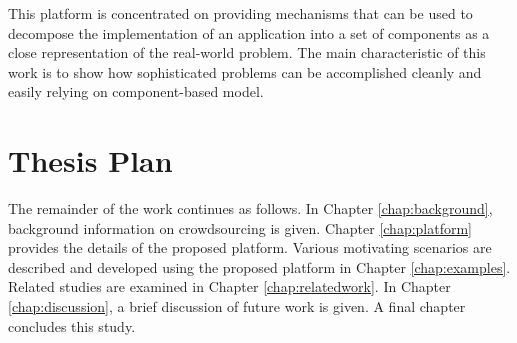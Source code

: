 This platform is concentrated on providing mechanisms that can be used to decompose 
the implementation of an application into a set of components as a close representation 
of the real-world problem. The main characteristic of this work is to show how 
sophisticated problems can be accomplished cleanly and easily relying on 
component-based model.


\section{Thesis Plan}

The remainder of the work continues as follows. In Chapter \ref{chap:background}, 
background information on crowdsourcing is given. Chapter \ref{chap:platform} provides 
the details of the proposed platform. Various motivating scenarios are described and 
developed using the proposed platform in Chapter 
\ref{chap:examples}. Related studies are examined in Chapter \ref{chap:relatedwork}. In Chapter \ref{chap:discussion}, a brief discussion of future work 
is given. A final chapter concludes this study.
